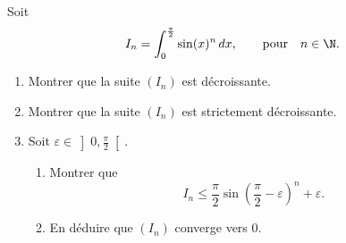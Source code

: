 Soit 
\[ I_n= \int_0^{\frac{\pi}{2}} \sin(x)^n \, dx, \quad \quad \text{pour} \quad n\in \N.\]
\begin{enumerate}
\item Montrer que la suite $(I_n)$ est décroissante.
\item Montrer que la suite $(I_n)$ est strictement décroissante.
\item Soit $\varepsilon \in \left] 0 ,\frac{\pi}{2} \right[$. \begin{enumerate}
\item  Montrer que 
\[ I_n \leqslant \frac{\pi}{2} \sin \left( \frac{\pi}{2} - \varepsilon \right)^n + \varepsilon.\]
\item En déduire que $(I_n)$ converge vers $0$.
\end{enumerate}
\end{enumerate}